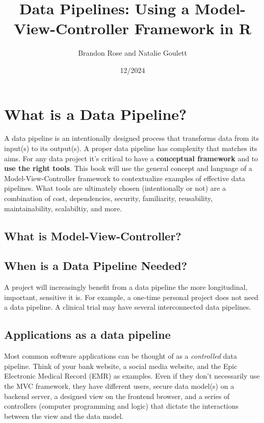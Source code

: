 \documentclass[
]{book}
\title{Data Pipelines: Using a Model-View-Controller Framework in R}
\author{Brandon Rose and Natalie Goulett}
\date{12/2024}
\begin{document}
\maketitle

{
\setcounter{tocdepth}{1}
\tableofcontents
}
\chapter{What is a Data Pipeline?}\label{what-is-a-data-pipeline}

A data pipeline is an intentionally designed process that transforms data from its input(s) to its output(s). A proper data pipeline has complexity that matches its aims. For any data project it's critical to have a \textbf{conceptual framework} and to \textbf{use the right tools}. This book will use the general concept and language of a Model-View-Controller framework to contextualize examples of effective data pipelines. What tools are ultimately chosen (intentionally or not) are a combination of cost, dependencies, security, familiarity, reusability, maintainability, scalabiltiy, and more.

\section{What is Model-View-Controller?}\label{what-is-model-view-controller}

\section{When is a Data Pipeline Needed?}\label{when-is-a-data-pipeline-needed}

A project will increasingly benefit from a data pipeline the more longitudinal, important, sensitive it is. For example, a one-time personal project does not need a data pipeline. A clinical trial may have several interconnected data pipelines.

\section{Applications as a data pipeline}\label{applications-as-a-data-pipeline}

Most common software applications can be thought of as a \emph{controlled} data pipeline. Think of your bank website, a social media website, and the Epic Electronic Medical Record (EMR) as examples. Even if they don't necessarily use the MVC framework, they have different users, secure data model(s) on a backend server, a designed view on the frontend browser, and a series of controllers (computer programming and logic) that dictate the interactions between the view and the data model.
\end{document}
